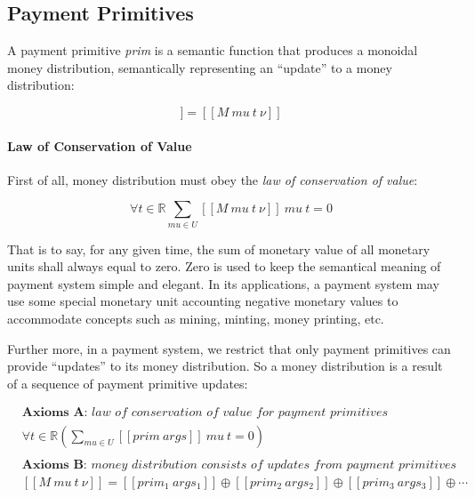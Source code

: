 \subsection{Payment Primitives}

A payment primitive \textit{prim} is a semantic function that produces a monoidal money distribution, semantically
representing an ``update'' to a money distribution:

\begin{equation}
    [\![prim\ args]\!] = [\![M\ mu\ t\ \nu]\!]
\end{equation}

\paragraph{Law of Conservation of Value}

First of all, money distribution must obey the \textit{law of conservation of value}:

\begin{equation}
    \forall t \in \mathbb{R} {\displaystyle \sum_{mu \in U} [\![M\ mu\ t\ \nu]\!]\ mu\ t = 0}
\end{equation}

That is to say, for any given time, the sum of monetary value of all monetary units shall always equal to zero. Zero is
used to keep the semantical meaning of payment system simple and elegant. In its applications, a payment system may use
some special monetary unit accounting negative monetary values to accommodate concepts such as mining, minting, money
printing, etc.

Further more, in a payment system, we restrict that only payment primitives can provide ``updates'' to its money
distribution. So a money distribution is a result of a sequence of payment primitive updates:

\begin{equation}
    \begin{split}
        &\textbf{Axioms A:\ }
        \textit{law of conservation of value for payment primitives} \\
        &\forall t \in \mathbb{R} ({\displaystyle \sum_{mu \in U} [\![prim\ args]\!]\ mu\ t = 0}) \\
        \\
        &\textbf{Axioms B:\ }
        \textit{money distribution consists of updates from payment primitives} \\
        &[\![M\ mu\ t\ \nu]\!] =
          [\![prim_1\ args_1]\!] \oplus [\![prim_2\ args_2]\!] \oplus [\![prim_3\ args_3]\!] \oplus \dotsb
    \end{split}
\end{equation}

